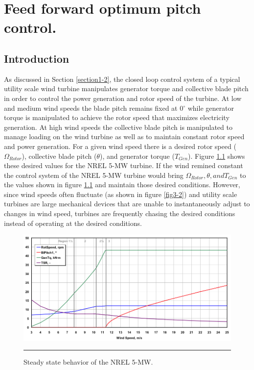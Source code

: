 
\chapter{Feed forward optimum pitch control.} %

\label{Chapter3} %



\section{Introduction} \label{section3-1}
As discussed in Section \ref{section1-2}, the closed loop control system of a typical utility scale wind turbine manipulates generator torque and collective blade pitch in order to control the power generation and rotor speed of the turbine. At low and medium wind speeds the blade pitch remains fixed at 0$^\circ$ while generator torque is manipulated to achieve the rotor speed that maximizes electricity generation. At high wind speeds the collective blade pitch is manipulated to manage loading on the wind turbine as well as to maintain constant rotor speed and power generation. For a given wind speed there is a desired rotor speed ($\Omega_{Rotor}$), collective blade pitch ($\theta$), and generator torque ($T_{Gen}$). Figure \ref{fig3-1} shows these desired values for the NREL 5-MW turbine. If the wind remined constant the control system of the NREL 5-MW turbine would bring $\Omega_{Rotor}, \theta, and T_{Gen}$ to the values shown in figure \ref{fig3-1} and maintain those desired conditions. However, since wind speeds often fluctuate (as shown in figure \ref{fig3-2}) and utility scale turbines are large mechanical devices that are unable to instantaneously adjust to changes in wind speed, turbines are frequently chasing the desired conditions instead of operating at the desired conditions.

\begin{figure}[htbp]
	\centering
		\includegraphics[width=\linewidth]{Figures/ch2Figures/fig2-1.png}
		\rule{35em}{0.5pt}
	\caption{Steady state behavior of the NREL 5-MW.\cite{jonkman2009}}
	\label{fig3-1}
\end{figure}

